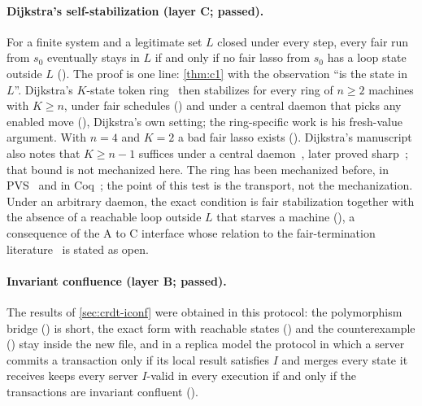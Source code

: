 \paragraph{Dijkstra's self-stabilization (layer C; passed).}
For a finite system and a legitimate set $L$ closed under every step, every fair run from $s_0$
eventually stays in $L$ if and only if no fair lasso from $s_0$ has a loop state outside $L$
(). The proof is one line: \cref{thm:c1} with the observation ``is the state in
$L$''. Dijkstra's $K$-state token ring~\cite{dijkstra1974} then stabilizes for every ring of
$n \ge 2$ machines with $K \ge n$, under fair schedules () and under a central
daemon that picks any enabled move (), Dijkstra's own setting; the
ring-specific work is his fresh-value argument. With $n = 4$ and $K = 2$ a bad fair lasso exists
(). Dijkstra's manuscript also notes that $K \ge n - 1$ suffices under a central
daemon~\cite{ewd426}, later proved sharp~\cite{fokkink2005}; that bound is not mechanized here. The ring has been
mechanized before, in PVS~\cite{qadeer1998} and in Coq~\cite{altisen2017}; the point of this test is
the transport, not the mechanization. Under an arbitrary daemon, the exact condition is fair
stabilization together with the absence of a reachable loop outside $L$ that starves a machine
(), a consequence of the A to C interface whose relation to the fair-termination
literature~\cite{lehmann1981,francez1986} is stated as open.

\paragraph{Invariant confluence (layer B; passed).}
The results of \cref{sec:crdt-iconf} were obtained in this protocol: the polymorphism bridge
() is short, the exact form with reachable states () and
the counterexample () stay inside the new file, and in a replica model the protocol in which a server commits a transaction only if its local result satisfies $I$ and merges every state it receives keeps every server $I$-valid in every execution if and only if the transactions are invariant confluent
().

